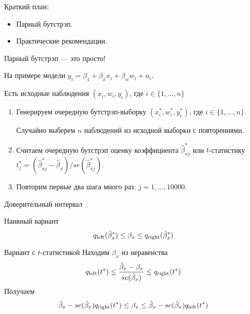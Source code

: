 
\begin{frame} %


\end{frame}



\begin{frame}{Краткий план:}
  \begin{itemize}[<+->]
    \item Парный бутстрэп.
    \item Практические рекомендации.
  \end{itemize}

\end{frame}


\begin{frame}{Парный бутстрэп — это просто!}

На примере модели $y_i = \beta_1 + \beta_x x_i + \beta_w w_i + u_i$.

Есть исходные наблюдения $(x_i, w_i, y_i)$, где $i \in \{1, \ldots, n\}$

\begin{enumerate}[<+->]
    \item Генерируем очередную бутстрэп-выборку $(x^*_i, w^*_i, y^*_i)$, где $i \in \{1, \ldots, n\}$.
    
    Случайно выберем $n$ наблюдений из исходной выборки с повторениями.
\item Считаем очередную бутстрэп оценку коэффициента $\hat \beta^*_{xj}$ или $t$-статистику 
$t^*_{j} = (\hat \beta^*_{xj} - \hat\beta_x)/se(\hat \beta^*_{xj})$.
    \item Повторим первые два шага много раз: $j = 1, \ldots, 10000$.
\end{enumerate}
\end{frame}

\begin{frame}{Доверительный интервал}

\begin{block}{Наивный вариант}
\[
q_{\text{left}}(\hat \beta_x^*) \leq \beta_x \leq q_{\text{right}}(\hat \beta_x^*)
\]
\end{block}

\begin{block}{Вариант с $t$-статистикой}
Находим $\beta_x$ из неравенства
\[
q_{\text{left}}(t^*) \leq \frac{\hat \beta_x - \beta_x}{se(\hat \beta_x)} \leq q_{\text{right}}(t^*)    
\]
Получаем 
\[
\hat \beta_x  - se(\hat \beta_x) q_{\text{right}}(t^*) \leq \beta_x \leq \hat \beta_x - se(\hat \beta_x) q_{\text{left}}(t^*)      
\]
\end{block}

\end{frame}





